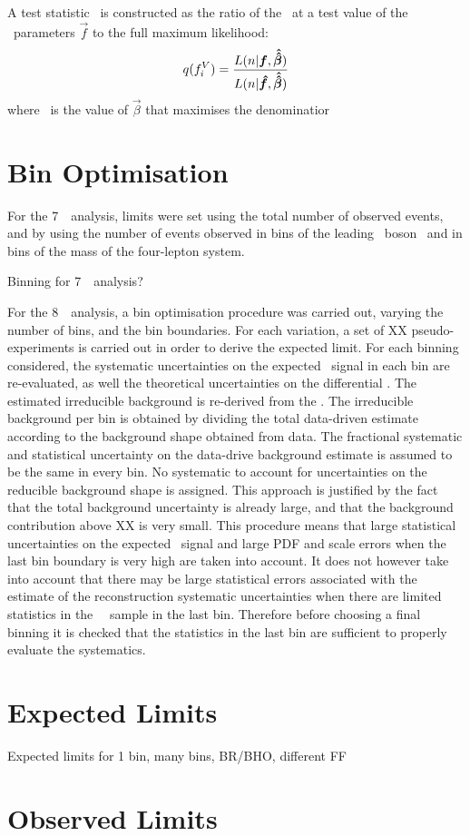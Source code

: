 A test statistic \teststat\ is constructed as the ratio of the \maxprofilellh\
at a test value of the \TGC\ parameters $\vec{f}$ to the full maximum likelihood:
\begin{equation}
q({f_{i}^{V}}) =
\frac{L(n|\boldsymbol{f},\boldsymbol{\hat{\hat{\beta}}})}{L(n|\boldsymbol{\hat{f}},\boldsymbol{\hat{\hat{\beta}}})}
\end{equation}
where \betahathat\ is the value of $\vec{\beta}$ that maximises the denominatior


\section{Bin Optimisation}

For the 7~\tev\ analysis, limits were set using the total number of observed
events, and by using the number of events observed in bins of the leading \Z\
boson \pt\ and in bins of the mass of the four-lepton system. 

Binning for 7~\tev\ analysis?

For the 8~\tev\ analysis, a bin optimisation procedure was carried out, varying
the number of bins, and the bin boundaries. For each variation, a set of XX
pseudo-experiments is carried out in order to derive the expected limit. For
each binning considered, the systematic uncertainties on the expected \sm\ signal
in each bin are re-evaluated, as well the theoretical uncertainties on the
differential \cx. The estimated irreducible background is re-derived from the
\mc. The irreducible background per bin is obtained by dividing the total
data-driven estimate according to the background shape obtained from data. The
fractional systematic and statistical uncertainty on the data-drive background
estimate is assumed to be the same in every bin. No systematic to
account for uncertainties on the reducible background shape is assigned. This
approach is justified by the fact that the total background uncertainty is
already large, and that the background contribution above XX is very small.
This procedure means that large statistical uncertainties on the expected \sm\
signal and large PDF and scale errors when the last bin boundary is very high are taken into account. It does
not however take into account that there may be large statistical errors
associated with the estimate of the reconstruction systematic uncertainties when
there are limited statistics in the \sm\ \mc\ sample in the last bin. Therefore
before choosing a final binning it is checked that the statistics in the last
bin are sufficient to properly evaluate the systematics.

\section{Expected Limits}

Expected limits for 1 bin, many bins, BR/BHO, different FF

\section{Observed Limits}
